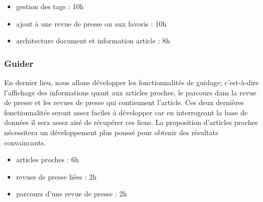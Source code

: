 		\begin{itemize}
			\item gestion des tags : 10h
			\item ajout à une revue de presse ou aux favoris : 10h
			\item architecture document et information article : 8h
		\end{itemize}

	\subsubsection{Guider}
	\label{subsubsec:guider}
		En dernier lieu, nous allons développer les fonctionnalités de guidage; c'est-à-dire l'affichage des informations quant aux articles proches, le parcours dans la revue de presse et les revues de presse qui contiennent l'article. Ces deux dernières fonctionnalités seront assez faciles à développer car en interrogeant la base de données il sera assez aisé de récupérer ces liens. La proposition d'articles proches nécessitera un développement plus poussé pour obtenir des résultats convaincants.

		\begin{itemize}
			\item articles proches : 6h
			\item revues de presse liées : 2h
			\item parcours d'une revue de presse : 2h
		\end{itemize}